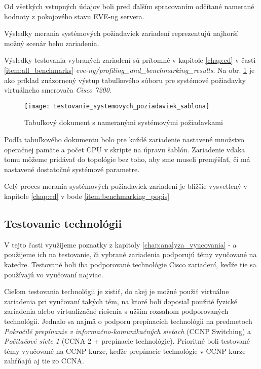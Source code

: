 Od všetkých vstupných údajov boli pred ďalším spracovaním odčítané namerané hodnoty z pokojového stavu EVE-ng servera.

Výsledky merania systémových požiadaviek zariadení reprezentujú najhorší možný scenár behu zariadenia.

Výsledky testovania vybraných zariadení sú prítomné v kapitole \ref{chap:cd} v časti \ref{item:all_benchmarks} \emph{eve-ng/profiling\_and\_benchmarking\_results}. Na obr. \ref{obr:testovanie_systemovych_poziadaviek_sablona} je ako príklad znázornený výstup tabuľkového súboru pre systémové požiadavky virtuálneho smerovača \emph{Cisco 7200}.

\begin{figure}
    \centering
    \texttt{[image: testovanie\_systemovych\_poziadaviek\_sablona]}
    \caption{Tabuľkový dokument s nameranými systémovými požiadavkami}
    \label{obr:testovanie_systemovych_poziadaviek_sablona}
\end{figure}


Podľa tabuľkového dokumentu bolo pre každé zariadenie nastavené množstvo operačnej pamäte a počet CPU v skripte na úpravu šablón. Zariadenie vďaka tomu môžeme pridávať do topológie bez toho, aby sme museli premýšľať, či má nastavené dostatočné systémové parametre.

Celý proces merania systémových požiadaviek zariadení je bližšie vysvetlený v kapitole \ref{chap:cd} v bode \ref{item:benchmarking_popis}





\subsection{Testovanie technológii}
\label{chap:testovanie_technologii}

V tejto časti využijeme poznatky z kapitoly \ref{chap:analyza_vyucovania} -  a použijeme ich na testovanie, či vybrané zariadenia podporujú témy vyučované na katedre. Testované boli iba podporované technológie Cisco zariadení, keďže tie sa používajú vo vyučovaní najviac.

Cieľom testovania technológii je zistiť, do akej je možné použiť virtuálne zariadenia pri vyučovaní takých tém, na ktoré boli doposiaľ použité fyzické zariadenia alebo virtualizačné riešenia s užším rozsahom podporovaných technológii. Jednalo sa najmä o podporu prepínacích technológii na predmetoch \emph{Pokročilé prepínanie v informačno-komunikačných sieťach} (CCNP Switching) a \emph{Počítačové siete 1} (CCNA 2 + prepínacie technológie). Prioritné boli testované témy vyučované na CCNP kurze, keďže prepínacie technológie v CCNP kurze zahŕňajú aj tie zo CCNA.





